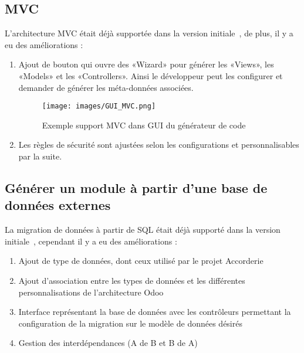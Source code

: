 \subsection{MVC}

L’architecture MVC était déjà supportée dans la version initiale~\cite{bluiksnot_repo}, de plus, il y a eu des améliorations : 

\begin{enumerate}
 \item Ajout de bouton qui ouvre des «Wizard» pour générer les «Views», les «Models» et les «Controllers». Ainsi le développeur peut les configurer et demander de générer les méta-données associées.
    \begin{figure}[htb]
    \centering
    \texttt{[image: images/GUI\_MVC.png]}
    \caption{Exemple support MVC dans GUI du générateur de code}
    \label{fig:dia_gui_mvc}
    \end{figure}
 \item Les règles de sécurité sont ajustées selon les configurations et personnalisables par la suite.
\end{enumerate}

\subsection{Générer un module à partir d’une base de données externes}


La migration de données à partir de SQL était déjà supporté dans la version initiale~\cite{bluiksnot_repo}, cependant il y a eu des améliorations : 

\begin{enumerate}
    \item Ajout de type de données, dont ceux utilisé par le projet Accorderie
    \item Ajout d'association entre les types de données et les différentes personnalisations de l’architecture Odoo
    \item Interface représentant la base de données avec les contrôleurs permettant la configuration de la migration sur le modèle de données désirés
    \item Gestion des interdépendances (A de B et B de A)
\end{enumerate}

